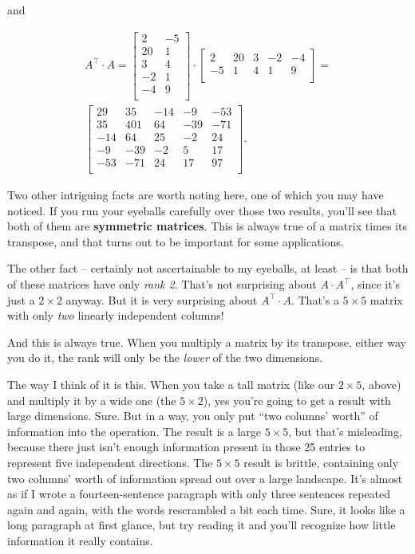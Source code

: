 and 

\vspace{-.15in}
\begin{align*}
A^\intercal \cdot A = 
\begin{bmatrix}
2 & -5 \\
20 & 1 \\
3 & 4 \\
-2 & 1 \\
-4 & 9 \\
\end{bmatrix} \cdot
\begin{bmatrix}
2 & 20 & 3 & -2 & -4 \\
-5 & 1 & 4 & 1 & 9 \\
\end{bmatrix} = \\
\begin{bmatrix}
29 & 35 & -14 & -9 & -53 \\
35 & 401 & 64 & -39 & -71 \\
-14 & 64 & 25 & -2 & 24 \\
-9 & -39 & -2 & 5 & 17 \\
-53 & -71 & 24 & 17 & 97 \\
\end{bmatrix}.
\end{align*}
\vspace{-.15in}


Two other intriguing facts are worth noting here, one of which you may have
noticed. If you run your eyeballs carefully over those two results, you'll see
that both of them are \textbf{symmetric matrices}. This is always true of a
matrix times its transpose, and that turns out to be important for some
applications.

The other fact -- certainly not ascertainable to my eyeballs, at least -- is
that both of these matrices have only \textit{rank 2}. That's not surprising
about $A\cdot A^\intercal$, since it's just a $2\times 2$ anyway. But it is
very surprising about $A^\intercal \cdot A$. That's a $5\times 5$ matrix with
only \textit{two} linearly independent columns!

And this is always true. When you multiply a matrix by its transpose, either
way you do it, the rank will only be the \textit{lower} of the two dimensions.

The way I think of it is this. When you take a tall matrix (like our $2\times
5$, above) and multiply it by a wide one (the $5\times 2$), yes you're going to
get a result with large dimensions. Sure. But in a way, you only put ``two
columns' worth'' of information into the operation. The result is a large
$5\times 5$, but that's misleading, because there just isn't enough information
present in those 25 entries to represent five independent directions. The
$5\times 5$ result is brittle, containing only two columns' worth of
information spread out over a large landscape. It's almost as if I wrote a
fourteen-sentence paragraph with only three sentences repeated again and again,
with the words rescrambled a bit each time. Sure, it looks like a long
paragraph at first glance, but try reading it and you'll recognize how little
information it really contains.

